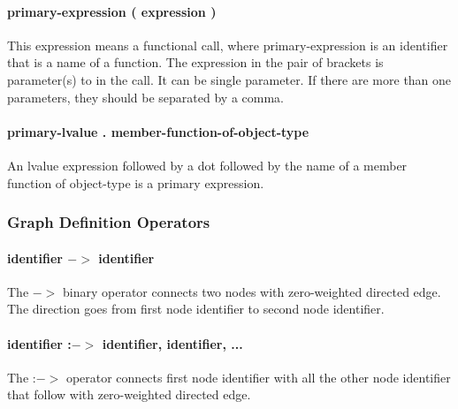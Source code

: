 \documentclass[a4paper,12pt]{article}
\begin{document}
\paragraph{primary-expression ( expression ) }
This expression means a functional call, where primary-expression is an identifier that is a name of a function. The expression in the pair of brackets is parameter(s) to in the call. It can be single parameter. If there are more than one parameters, they should be separated by a comma.

\paragraph{primary-lvalue . member-function-of-object-type}
An lvalue expression followed by a dot followed by the name of a member function of object-type is a primary expression.

\subsubsection{Graph Definition Operators}

\paragraph{identifier $->$ identifier}
The $->$ binary operator connects two nodes with zero-weighted directed edge. The direction goes from first node identifier to second node identifier.


\paragraph{identifier :$->$ identifier, identifier, ...}
The :$->$ operator connects first node identifier with all the other node identifier that follow with zero-weighted directed edge.
\end{document}
